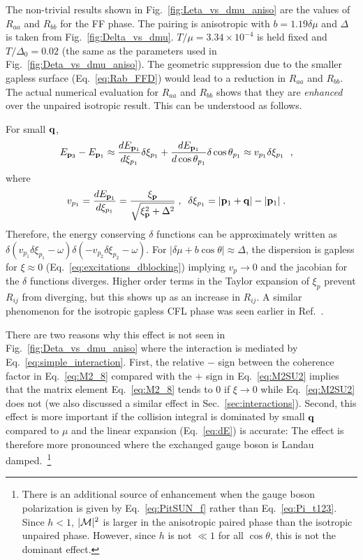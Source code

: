 \documentclass[10pt, aps, prd, superscriptaddress, nofootinbib, 
               amsmath, amssymb, twocolumn,
               preprintnumbers, showpacs,
               raggedbottom,
               floatfix]{revtex4-1}
\newcommand{\calM}{{\cal{M}}}
\newcommand{\bfp}{{\bf{p}}}
\newcommand{\bfq}{{\bf{q}}}
\begin{document}
The non-trivial results shown in Fig.~\ref{fig:Leta_vs_dmu_aniso} are the
values of $R_{aa}$ and $R_{bb}$ for the FF phase. The pairing is anisotropic
with $b=1.19\delta\mu$ and $\Delta$ is taken from Fig.~\ref{fig:Delta_vs_dmu}.
$T/\mu=3.34\times10^{-4}$ is held fixed and $T/\Delta_0=0.02$ (the same as the
parameters used in Fig.~\ref{fig:Deta_vs_dmu_aniso}). The geometric suppression
due to the smaller gapless surface (Eq.~\ref{eq:Rab_FFD}) would lead to a
reduction in $R_{aa}$ and $R_{bb}$. The actual
numerical evaluation for $R_{aa}$ and $R_{bb}$ shows that they are
{\it{enhanced}} over the unpaired isotropic result. This can be understood as
follows.

For small $\bfq$,
\begin{equation}
\begin{split}
E_{\bfp_3}-E_{\bfp_1} 
&\approx \frac{d E_{\bfp_1}}{d\xi_{p_1}}\delta\xi_{p_1} 
+ \frac{d E_{\bfp_1}}{d\cos\theta_{p_1}}\delta\cos\theta_{p_1} 
\approx  v_{p_1}\delta\xi_{p_1}~\label{eq:dE}\;,
\end{split}
\end{equation}
where
\begin{equation}
\begin{split}
v_{p_1} &= \frac{d E_{\bfp_1}}{d\xi_{p_1}}=\frac{\xi_{\bfp}}{\sqrt{\xi_{\bfp}^2+\Delta^2}}\;,\;\;
\delta\xi_{p_1} = |\bfp_1+\bfq|-|\bfp_1|\;.
\end{split}
\end{equation}
Therefore, the energy conserving $\delta$ functions can be approximately written as
$\delta({v_{p_1}}\delta\xi_{p_1}-\omega)\delta(-{v_{p_2}}\delta\xi_{p_2}-\omega)$.
For $|\delta\mu+b\cos\theta|\approx\Delta$, the dispersion is gapless for
$\xi\approx 0$ (Eq.~\ref{eq:excitations_dblocking}) implying $v_p\rightarrow 0$ 
and the jacobian for the $\delta$ functions diverges. Higher order terms in the
Taylor expansion of $\xi_p$ prevent $R_{ij}$ from diverging, but this shows up as an increase in $R_{ij}$. A similar 
phenomenon for the isotropic gapless CFL phase was seen earlier in
Ref.~\cite{Alford:2005pooja}.

There are two reasons why this effect is not seen in
Fig.~\ref{fig:Deta_vs_dmu_aniso} where the interaction is mediated by
Eq.~\ref{eq:simple_interaction}. First, the relative $-$ sign between the
coherence factor in Eq.~\ref{eq:M2_8} compared with the $+$ sign in
Eq.~\ref{eq:M2SU2} implies that the matrix element Eq.~\ref{eq:M2_8}
tends to $0$ if $\xi\rightarrow 0$ while Eq.~\ref{eq:M2SU2} does not (we also
discussed a similar effect in Sec.~\ref{sec:interactions}). Second, this effect
is more important if the collision integral is dominated by small $\bfq$
compared to $\mu$ and
the linear expansion (Eq.~\ref{eq:dE}) is accurate: The effect is therefore more
pronounced where the exchanged gauge boson is Landau damped.~\footnote{There is
an additional source of enhancement when the gauge boson polarization is given
by Eq.~\ref{eq:PitSUN_f} rather than Eq.~\ref{eq:Pi_t123}. Since $h<1$,
$|\calM|^2$ is larger in the anisotropic paired phase than the isotropic
unpaired phase. However, since $h$ is not $\ll 1$ for all $\cos\theta$, this is
not the dominant effect.} 
\end{document}
